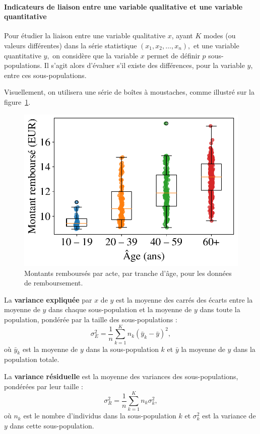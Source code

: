 \paragraph{Indicateurs de liaison entre une variable qualitative et une variable quantitative}
Pour étudier la liaison entre une variable qualitative $x$, ayant $K$ modes (ou
valeurs différentes) dans la série statistique $(x_1, x_2, \dots, x_n),$ et une
variable quantitative $y,$ on considère que la variable $x$ permet de définir
$p$ sous-populations. Il s'agit alors d'évaluer s'il existe des différences,
pour la variable $y$, entre ces sous-populations.

Visuellement, on utilisera une série de boîtes à moustaches, comme illustré sur
la figure~\ref{fig:remboursement_rembourses_age}.

\begin{figure}[h]
  \centering
  \includegraphics[width=.5\textwidth]{figures/stats/remboursement_rembourses_age}
  \caption{Montants remboursés par acte, par tranche d'âge, pour les données de
    remboursement.}
  \label{fig:remboursement_rembourses_age}
\end{figure}

La \textbf{variance expliquée} par $x$ de $y$ est la moyenne des carrés des écarts
entre la moyenne de $y$ dans chaque sous-population et la moyenne de $y$ dans
toute la population, pondérée par la taille des sous-populations :
\[
  \sigma_E^2 = \frac1n \sum_{k=1}^K n_k (\bar{y}_k - \bar{y})^2,
\]
où $\bar{y}_k$ est la moyenne de $y$ dans la sous-population $k$ et $\bar{y}$
la moyenne de $y$ dans la population totale.

La \textbf{variance résiduelle} est la moyenne des variances des
sous-populations, pondérées par leur taille :
\[
  \sigma_R^2 = \frac1n \sum_{k=1}^K n_k \sigma_k^2, 
\]
où $n_k$ est le nombre d'individus dans la sous-population $k$ et $\sigma_k^2$
est la variance de $y$ dans cette sous-population.


